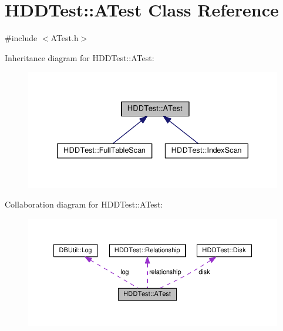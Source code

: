 \hypertarget{class_h_d_d_test_1_1_a_test}{\section{H\-D\-D\-Test\-:\-:A\-Test Class Reference}
\label{class_h_d_d_test_1_1_a_test}
}


{\ttfamily \#include $<$A\-Test.\-h$>$}



Inheritance diagram for H\-D\-D\-Test\-:\-:A\-Test\-:
\nopagebreak
\begin{figure}[H]
\begin{center}
\leavevmode
\includegraphics[width=335pt]{class_h_d_d_test_1_1_a_test__inherit__graph}
\end{center}
\end{figure}


Collaboration diagram for H\-D\-D\-Test\-:\-:A\-Test\-:
\nopagebreak
\begin{figure}[H]
\begin{center}
\leavevmode
\includegraphics[width=350pt]{class_h_d_d_test_1_1_a_test__coll__graph}
\end{center}
\end{figure}
